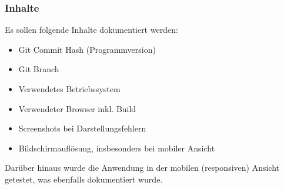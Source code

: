 \subsubsection{Inhalte}
Es sollen folgende Inhalte dokumentiert werden:
\begin{itemize}
    \item Git Commit Hash (Programmversion)
    \item Git Branch
    \item Verwendetes Betriebssystem
    \item Verwendeter Browser inkl. Build
    \item Screenshots bei Darstellungsfehlern
    \item Bildschirmauflösung, insbesonders bei mobiler Ansicht
\end{itemize}
Darüber hinaus wurde die Anwendung in der mobilen (responsiven) Ansicht getestet, was ebenfalls dokumentiert wurde.

